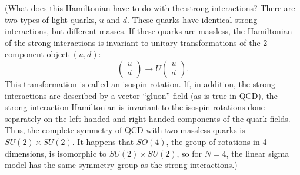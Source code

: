 (What does this Hamiltonian have to do with the strong interactions?  There
are two types of light quarks, $u$ and $d$.  These quarks have identical
strong interactions, but different masses.  If these quarks are massless, the
Hamiltonian of the strong interactions is invariant to unitary
transformations of the 2-component object $(u,d)$:
\begin{equation}
  \begin{pmatrix}u\\ d\end{pmatrix} \to U\begin{pmatrix}u\\ d\end{pmatrix} .
\end{equation}
This transformation is called an isospin rotation.  If, in addition, the
strong interactions are described by a vector ``gluon'' field (as is true in
QCD), the strong interaction Hamiltonian is invariant to the isospin rotations
done separately on the left-handed and right-handed components of the quark
fields.  Thus, the complete symmetry of QCD with two massless quarks is
$SU(2)\times SU(2)$.  It happens that $SO(4)$, the group of rotations in 4
dimensions, is isomorphic to $SU(2)\times SU(2)$, so for $N=4$, the linear
sigma model has the same symmetry group as the strong interactions.)
